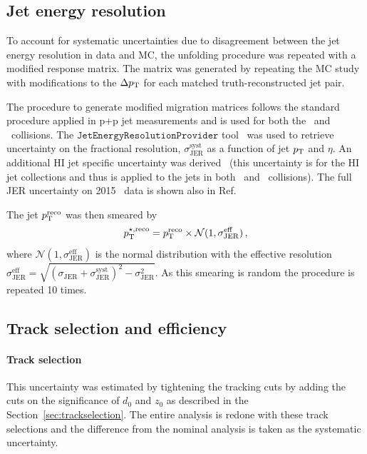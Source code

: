 \subsection{Jet energy resolution}
To account for systematic uncertainties due to disagreement between the jet energy resolution in data and MC, the unfolding procedure was repeated with a modified response matrix. The matrix was generated by repeating the MC study with modifications to the $\Delta p_{\mathrm{T}}$ for each matched truth-reconstructed jet pair. 



     The procedure to generate modified migration matrices follows the standard procedure applied in p+p jet measurements 
     and is used for both the \pp\ and \pbpb\ collisions. 
     The $\texttt{JetEnergyResolutionProvider}$ tool~\cite{JERUncertaintyProviderRun2} was used to 
     retrieve uncertainty on the fractional resolution, $\sigma^{\mathrm{syst}}_{\mathrm{JER}}$ as a function of jet $p_{\mathrm{T}}$ and $\eta$. An additional HI jet specific uncertainty was derived~\cite{cc2015} (this
     uncertainty is for the HI jet collections and thus is applied to the jets in both \pp\ and \pbpb\
     collisions). 
     The full JER uncertainty on 2015 \pp\ data is shown also in Ref.~\cite{Aad:1696485}

     The jet $p_{\mathrm{T}}^{\mathrm{reco}}$ was then smeared by
     \begin{equation}
	p_{\mathrm{T}}^{\star, \mathrm{reco}} = p_{\mathrm{T}}^{\mathrm{reco}}\times \mathcal{N}(1,\sigma^{\mathrm{eff}}_{\mathrm{JER}})\,,
     \end{equation}
     where $\mathcal{N}(1,\sigma^{\mathrm{eff}}_{\mathrm{JER}})$ is the normal distribution with the effective resolution $\sigma^{\mathrm{eff}}_{\mathrm{JER}}=\sqrt{(\sigma_{\mathrm{JER}} + \sigma^{\mathrm{syst}}_{\mathrm{JER}})^{2} - \sigma_{\mathrm{JER}}^{2}}$. As this smearing is random the procedure is repeated 10 times.



\subsection{Track selection and efficiency}

\paragraph{Track selection}  This uncertainty was estimated by tightening the tracking cuts by adding the cuts
on the significance of $d_0$ and $z_0$ as described in the Section~\ref{sec:trackselection}.  
The entire analysis is redone with these track selections and the difference from the nominal analysis is taken as the systematic uncertainty. 



